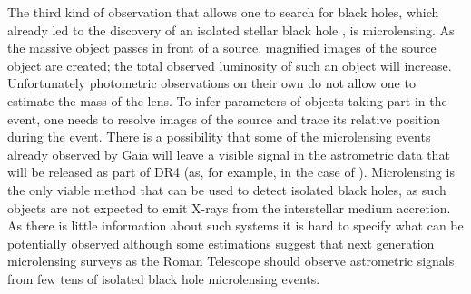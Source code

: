 \documentclass{pracalicmgr}
\begin{document}
The third kind of observation that allows one to search for black holes, which already led to the discovery of an isolated stellar black hole \citep{sahu_isolated_2022},
is microlensing. As the massive object passes in front of a source, magnified images of the source object are created; the total observed luminosity of such an object will
increase. Unfortunately photometric observations on their own do not allow one to estimate the mass of the lens. To infer parameters of objects taking
part in the event, one needs to resolve images of the source and trace its relative position during the event. 
There is a possibility that some of the microlensing events already observed by Gaia will leave a visible signal in the astrometric data
that will be released as part of DR4 (as, for example, in the case of \citet{kruszynska_lens_2022}). Microlensing is the only viable method that can be used to detect
isolated black holes, as such objects are not expected to emit X-rays from the interstellar medium accretion. As there is little information about such systems it is hard
to specify what can be potentially observed although some estimations \citep{sajadian_detecting_2023} suggest that next generation microlensing surveys as the Roman Telescope should
observe astrometric signals from few tens of isolated black hole microlensing events.
\end{document}
